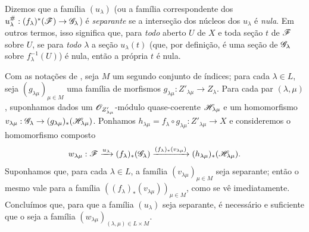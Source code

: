 
Dizemos que a família
$(u_\lambda)$ (ou a família
correspondente dos
$u_\lambda^\#:
(f_\lambda)^*(\sh{F})
\to\sh{G}_\lambda$) é
\emph{separante} se a
interseção dos núcleos
dos $u_\lambda$ é
\emph{nula}. Em outros
termos, isso significa que,
para \emph{todo} aberto
$U$ de $X$ e toda seção
$t$ de $\mathscr{F}$ sobre
$U$, se para \emph{todo}
$\lambda$ a seção
$u_\lambda(t)$ (que, por
definição, é uma seção de
$\mathscr{G}_\lambda$ sobre
$f_\lambda^{-1}(U)$) é
nula, então a própria
$t$ é nula.

\begin{env}[11.9.2]
\label{IV.11.9.2}
Com as notações de
, seja
$M$ um segundo conjunto
de índices; para cada
$\lambda\in L$, seja
$(g_{\lambda\mu})_{\mu\in M}$
uma família de morfismos
$g_{\lambda\mu}:
Z'_{\lambda\mu}\to Z_\lambda$.
Para cada par
$(\lambda,\mu)$,
suponhamos dados um
$\mathscr{O}_{Z'_{\lambda\mu}}$-módulo
quase-coerente
$\mathscr{H}_{\lambda\mu}$ e um
homomorfismo
$v_{\lambda\mu}:
\sh{G}_\lambda\to
(g_{\lambda\mu})_*
(\sh{H}_{\lambda\mu})$.
Ponhamos
$h_{\lambda\mu}
=f_\lambda\circ g_{\lambda\mu}:
Z'_{\lambda\mu}\to X$
e consideremos o
homomorfismo composto
\[
w_{\lambda\mu}:
\mathscr{F}
\xrightarrow{u_\lambda}
(f_\lambda)_*
(\mathscr{G}_\lambda)
\xrightarrow{(f_\lambda)_*
(v_{\lambda\mu})}
(h_{\lambda\mu})_*
(\mathscr{H}_{\lambda\mu}).
\]
Suponhamos que, para
cada $\lambda\in L$,
a família
$(v_{\lambda\mu})_{\mu\in M}$
seja separante; então
o mesmo vale para a
família
$((f_\lambda)_*
(v_{\lambda\mu}))_{\mu\in M}$,
como se vê imediatamente.
Concluímos que, para que
a família $(u_\lambda)$
seja separante, é
necessário e suficiente
que o seja a família
$(w_{\lambda\mu})_
{(\lambda,\mu)\in L\times M}$.
\end{env}

